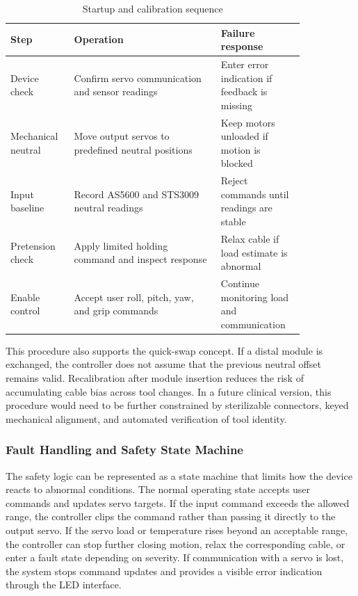 \begin{table}[htbp]
    \centering
    \caption{Startup and calibration sequence}
    \label{tab:startup_calibration}
    \begin{tabular}{p{0.16\linewidth} p{0.44\linewidth} p{0.24\linewidth}}
        \toprule
        Step & Operation & Failure response \\
        \midrule
        Device check & Confirm servo communication and sensor readings & Enter error indication if feedback is missing \\
        Mechanical neutral & Move output servos to predefined neutral positions & Keep motors unloaded if motion is blocked \\
        Input baseline & Record AS5600 and STS3009 neutral readings & Reject commands until readings are stable \\
        Pretension check & Apply limited holding command and inspect response & Relax cable if load estimate is abnormal \\
        Enable control & Accept user roll, pitch, yaw, and grip commands & Continue monitoring load and communication \\
        \bottomrule
    \end{tabular}
\end{table}

This procedure also supports the quick-swap concept. If a distal module is exchanged, the controller does not assume that the previous neutral offset remains valid. Recalibration after module insertion reduces the risk of accumulating cable bias across tool changes. In a future clinical version, this procedure would need to be further constrained by sterilizable connectors, keyed mechanical alignment, and automated verification of tool identity.

\subsubsection{Fault Handling and Safety State Machine}
The safety logic can be represented as a state machine that limits how the device reacts to abnormal conditions. The normal operating state accepts user commands and updates servo targets. If the input command exceeds the allowed range, the controller clips the command rather than passing it directly to the output servo. If the servo load or temperature rises beyond an acceptable range, the controller can stop further closing motion, relax the corresponding cable, or enter a fault state depending on severity. If communication with a servo is lost, the system stops command updates and provides a visible error indication through the LED interface.

